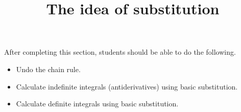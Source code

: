 \documentclass{ximera}
\title{The idea of substitution}
\begin{document}
\begin{abstract}
\end{abstract}

\maketitle

\begin{sectionOutcomes}

After completing this section, students should be able to do the following.

\begin{itemize}
	\item Undo the chain rule.
	\item Calculate indefinite integrals (antiderivatives) using basic substitution.
	\item Calculate definite integrals using basic substitution.
\end{itemize}

\end{sectionOutcomes}
\end{document}
